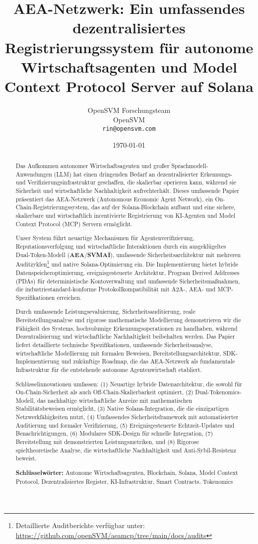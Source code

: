 \documentclass[12pt,a4paper]{article}
\title{AEA-Netzwerk: Ein umfassendes dezentralisiertes Registrierungssystem für autonome Wirtschaftsagenten und Model Context Protocol Server auf Solana}
\author{OpenSVM Forschungsteam\\
OpenSVM\\
\texttt{rin@opensvm.com}}
\date{\today}
\begin{document}
\maketitle

\begin{abstract}
Das Aufkommen autonomer Wirtschaftsagenten und großer Sprachmodell-Anwendungen (LLM) hat einen dringenden Bedarf an dezentralisierter Erkennungs- und Verifizierungsinfrastruktur geschaffen, die skalierbar operieren kann, während sie Sicherheit und wirtschaftliche Nachhaltigkeit aufrechterhält. Dieses umfassende Papier präsentiert das AEA-Netzwerk (Autonomous Economic Agent Network), ein On-Chain-Registrierungssystem, das auf der Solana-Blockchain aufbaut und eine sichere, skalierbare und wirtschaftlich incentivierte Registrierung von KI-Agenten und Model Context Protocol (MCP) Servern ermöglicht.

Unser System führt neuartige Mechanismen für Agentenverifizierung, Reputationsverfolgung und wirtschaftliche Interaktionen durch ein ausgeklügeltes Dual-Token-Modell (\textbf{AEA}/\textbf{SVMAI}), umfassende Sicherheitsarchitektur mit mehreren Auditzyklen\footnote{Detaillierte Auditberichte verfügbar unter: \url{https://github.com/openSVM/aeamcp/tree/main/docs/audits}} und native Solana-Optimierung ein. Die Implementierung bietet hybride Datenspeicheroptimierung, ereignisgesteuerte Architektur, Program Derived Addresses (PDAs) für deterministische Kontoverwaltung und umfassende Sicherheitsmaßnahmen, die industriestandard-konforme Protokollkompatibilität mit A2A-, AEA- und MCP-Spezifikationen erreichen.

Durch umfassende Leistungsevaluierung, Sicherheitsauditierung, reale Bereitstellungsanalyse und rigorose mathematische Modellierung demonstrieren wir die Fähigkeit des Systems, hochvolumige Erkennungsoperationen zu handhaben, während Dezentralisierung und wirtschaftliche Nachhaltigkeit beibehalten werden. Das Papier liefert detaillierte technische Spezifikationen, umfassende Sicherheitsanalyse, wirtschaftliche Modellierung mit formalen Beweisen, Bereitstellungsarchitektur, SDK-Implementierung und zukünftige Roadmap, die das AEA-Netzwerk als fundamentale Infrastruktur für die entstehende autonome Agentenwirtschaft etabliert.

Schlüsselinnovationen umfassen: (1) Neuartige hybride Datenarchitektur, die sowohl für On-Chain-Sicherheit als auch Off-Chain-Skalierbarkeit optimiert, (2) Dual-Tokenomics-Modell, das nachhaltige wirtschaftliche Anreize mit mathematischen Stabilitätsbeweisen ermöglicht, (3) Native Solana-Integration, die die einzigartigen Netzwerkfähigkeiten nutzt, (4) Umfassendes Sicherheitsframework mit automatisierter Auditierung und formaler Verifizierung, (5) Ereignisgesteuerte Echtzeit-Updates und Benachrichtigungen, (6) Modulares SDK-Design für schnelle Integration, (7) Bereitstellung mit demonstrierten Leistungsmetriken, und (8) Rigorose spieltheoretische Analyse, die wirtschaftliche Nachhaltigkeit und Anti-Sybil-Resistenz beweist.

\textbf{Schlüsselwörter:} Autonome Wirtschaftsagenten, Blockchain, Solana, Model Context Protocol, Dezentralisiertes Register, KI-Infrastruktur, Smart Contracts, Tokenomics
\end{abstract}
\end{document}
